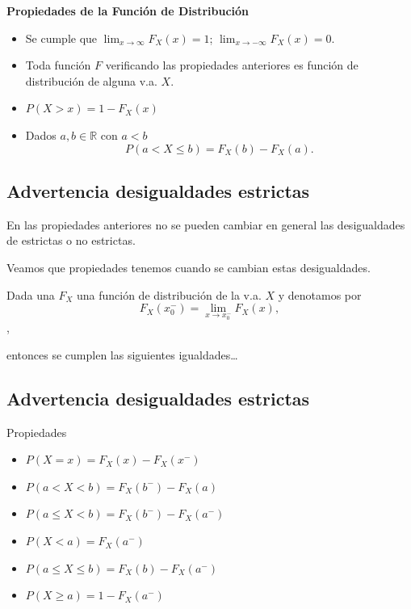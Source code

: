 \documentclass[]{book}
\providecommand{\tightlist}{%
  \setlength{\itemsep}{0pt}\setlength{\parskip}{0pt}}
\begin{document}
 \textbf{Propiedades de la Función de Distribución}

\begin{itemize}
\tightlist
\item
  Se cumple que \(\displaystyle \lim_{x\to\infty} F_{X}(x)=1\); \(\displaystyle \lim_{x\to-\infty}F_{X}(x)=0\).
\item
  Toda función \(F\) verificando las propiedades anteriores es función de distribución de alguna v.a. \(X\).
\item
  \(P(X>x)=1-F_{X}(x)\)
\item
  Dados \(a,b\in \mathbb{R}\) con \(a<b\) \[P(a<X\leq b)=F_{X}(b)-F_{X}(a).\]
\end{itemize}

\hypertarget{advertencia-desigualdades-estrictas}{%
\subsection{Advertencia desigualdades estrictas}\label{advertencia-desigualdades-estrictas}}

En las propiedades anteriores no se pueden cambiar en general las desigualdades de
estrictas o no estrictas.

Veamos que propiedades tenemos cuando se cambian estas
desigualdades.

Dada una \(F_{X}\) una función de distribución de la v.a. \(X\) y denotamos por \[F_{X}(x_0^{-})=\displaystyle \lim_{x\to x_0^{-}} F_{X}(x),\],

entonces se cumplen las siguientes igualdades\ldots{}

\hypertarget{advertencia-desigualdades-estrictas-1}{%
\subsection{Advertencia desigualdades estrictas}\label{advertencia-desigualdades-estrictas-1}}

Propiedades

\begin{itemize}
\tightlist
\item
  \(P(X=x)=F_{X}(x)-F_{X}(x^{-})\)
\item
  \(P(a< X< b)=F_{X}(b^{-})-F_{X}(a)\)
\item
  \(P(a\leq X< b)=F_{X}(b^{-})-F_{X}(a^{-})\)
\item
  \(P(X<a)=F_{X}(a^{-})\)
\item
  \(P(a\leq X\leq b)=F_{X}(b)-F_{X}(a^{-})\)
\item
  \(P(X\geq a)=1-F_{X}(a^{-})\)
\end{itemize}
\end{document}

